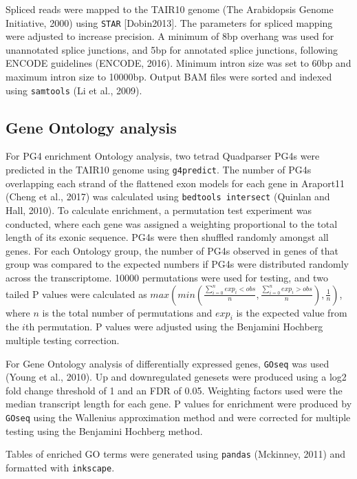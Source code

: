 \documentclass[12pt,a4paper,]{report}
\begin{document}
Spliced reads were mapped to the TAIR10 genome (The Arabidopsis Genome
Initiative, 2000) using \texttt{STAR} {[}Dobin2013{]}. The parameters
for spliced mapping were adjusted to increase precision. A minimum of
8bp overhang was used for unannotated splice junctions, and 5bp for
annotated splice junctions, following ENCODE guidelines (ENCODE, 2016).
Minimum intron size was set to 60bp and maximum intron size to 10000bp.
Output BAM files were sorted and indexed using \texttt{samtools} (Li et
al., 2009).

\hypertarget{gene-ontology-analysis}{%
\subsection{Gene Ontology analysis}\label{gene-ontology-analysis}}

For PG4 enrichment Ontology analysis, two tetrad Quadparser PG4s were
predicted in the TAIR10 genome using \texttt{g4predict}. The number of
PG4s overlapping each strand of the flattened exon models for each gene
in Araport11 (Cheng et al., 2017) was calculated using
\texttt{bedtools\ intersect} (Quinlan and Hall, 2010). To calculate
enrichment, a permutation test experiment was conducted, where each gene
was assigned a weighting proportional to the total length of its exonic
sequence. PG4s were then shuffled randomly amongst all genes. For each
Ontology group, the number of PG4s observed in genes of that group was
compared to the expected numbers if PG4s were distributed randomly
across the transcriptome. 10000 permutations were used for testing, and
two tailed P values were calculated as
\(max(min(\frac{\sum_{i=0}^nexp_i < obs}{n}, \frac{\sum_{i=0}^nexp_i > obs}{n}), \frac{1}{n})\),
where \(n\) is the total number of permutations and \(exp_i\) is the
expected value from the \(i\)th permutation. P values were adjusted
using the Benjamini Hochberg multiple testing correction.

For Gene Ontology analysis of differentially expressed genes,
\texttt{GOseq} was used (Young et al., 2010). Up and downregulated
genesets were produced using a log2 fold change threshold of 1 and an
FDR of 0.05. Weighting factors used were the median transcript length
for each gene. P values for enrichment were produced by \texttt{GOseq}
using the Wallenius approximation method and were corrected for multiple
testing using the Benjamini Hochberg method.

Tables of enriched GO terms were generated using \texttt{pandas}
(Mckinney, 2011) and formatted with \texttt{inkscape}.
\end{document}
